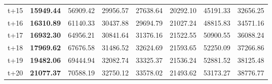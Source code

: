 \begin{table}[H]
\begin{tabular}{lrrrrrrr}
t+15  & \textbf{15949.44}  & 56909.42  & 29956.57  & 27638.64  & 20292.10  & 45191.33  & 32656.25  \\
t+16  & \textbf{16310.89}  & 61140.33  & 30437.88  & 29694.79  & 21027.24  & 48815.83  & 34571.16  \\
t+17  & \textbf{16932.30}  & 64956.21  & 30841.64  & 31376.16  & 21522.55  & 50900.55  & 36088.24  \\
t+18  & \textbf{17969.62}  & 67676.58  & 31486.52  & 32624.69  & 21593.65  & 52250.09  & 37266.86  \\
t+19  & \textbf{19482.06}  & 69444.94  & 32082.74  & 33325.37  & 21536.24  & 52881.52  & 38125.48  \\
t+20  & \textbf{21077.37}  & 70588.19  & 32750.12  & 33578.02  & 21493.62  & 53173.27  & 38776.77  \\

\bottomrule
\end{tabular}
\end{table}
